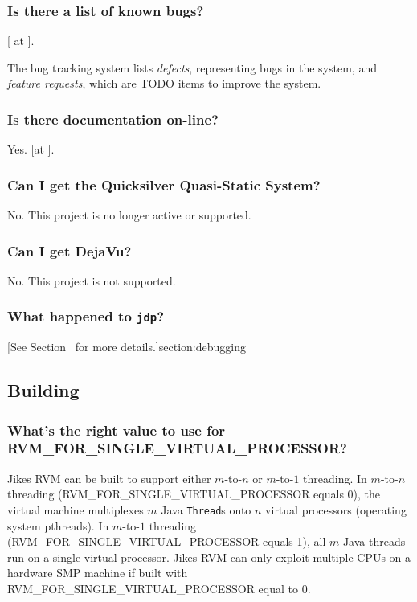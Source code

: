 \subsubsection{Is there a list of known bugs?}

[ at 
{\tt \RVMBugURL}]{\RVMBugURL}.

The bug tracking system lists {\em defects}, representing bugs in the system, and
{\em feature requests}, which are TODO items to improve the system.

\subsubsection{Is there documentation on-line?}

Yes.  [at
{\tt \RVMHomeURL}]{\RVMHomeURL}.

\subsubsection{Can I get the Quicksilver Quasi-Static System?}

No. This project is no longer active or supported.

\subsubsection{Can I get DejaVu?}

No. This project is not supported. 

\subsubsection{What happened to {\tt jdp}?}

[See
Section~\Ref{} for more details.]{section:debugging}

\subsection{Building \jrvm}


\subsubsection{What's the right value to use for
RVM\_\-FOR\_\-SIN\-GLE\_\-VIR\-TU\-AL\_\-PRO\-CES\-SOR?} 
\label{singleProcessorQuestion}

Jikes RVM can be built to support either $m$-to-$n$ or $m$-to-$1$
threading.  In $m$-to-$n$ threading
(RVM\_FOR\_SINGLE\_VIRTUAL\_PROCESSOR equals 0), the virtual machine
multiplexes $m$ Java {\tt Thread}s
onto $n$ virtual processors (operating system pthreads).
In $m$-to-$1$ threading (RVM\_FOR\_SINGLE\_VIRTUAL\_PROCESSOR equals 1),
all $m$ Java threads run on a single virtual processor.  Jikes RVM 
can only exploit multiple CPUs on a hardware SMP machine if 
built with RVM\_FOR\_SINGLE\_VIRTUAL\_PROCESSOR equal to 0.

